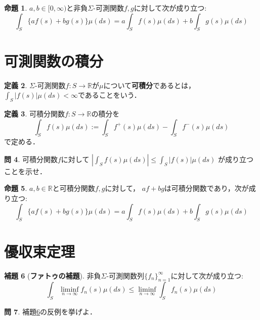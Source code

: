 \documentclass{jsreport}
\theoremstyle{definition}
\newtheorem{defi}{定義}[section]
\newtheorem{lem}[defi]{補題}
\newtheorem{prop}[defi]{命題}
\newtheorem{qst}[defi]{問}
\begin{document}
\begin{prop}\label{prop_linearity_of_nonnegative_function_integral}
$a,b\in[0,\infty)$と非負$\Sigma$-可測関数$f,g$に対して次が成り立つ:
\[ \int_S\{af(s)+bg(s)\}\mu(ds)=a\int_Sf(s)\mu(ds)+b\int_Sg(s)\mu(ds) \]
\end{prop}

\section{可測関数の積分}

\begin{defi}\label{def_integrable_function}
$\Sigma$-可測関数$f \colon S\to\mathbb{R}$が$\mu$について\textbf{可積分}であるとは，
$\displaystyle\int_S|f(s)|\mu(ds)<\infty$であることをいう．

\end{defi}

\begin{defi}\label{def_measurable_function_integral}
可積分関数$f \colon S\to\mathbb{R}$の積分を
\[ \int_S f(s)\mu(ds):=\int_S f^+(s)\mu(ds)-\int_S f^-(s)\mu(ds)  \]
で定める．
\end{defi}

\begin{qst}\label{qst_absolute_integral_and_integral_absolute}
可積分関数$f$に対して
$\displaystyle\left|\int_Sf(s)\mu(ds)\right|\leq\int_S|f(s)|\mu(ds)$
が成り立つことを示せ．
\end{qst}

\begin{prop}\label{prop_linearity_of_integrable_function_integral}
$a,b\in\mathbb{R}$と可積分関数$f,g$に対して，
$af+bg$は可積分関数であり，次が成り立つ:
\[ \int_S\{af(s)+bg(s)\}\mu(ds)=a\int_Sf(s)\mu(ds)+b\int_Sg(s)\mu(ds) \]
\end{prop}

\section{優収束定理}

\begin{lem}[\textbf{ファトゥの補題}]\label{Fatou_lemma}
非負$\Sigma$-可測関数列$\{f_n\}_{n=1}^\infty$に対して次が成り立つ:
\[ \int_S\liminf_{n\to\infty}f_n(s)\mu(ds)\leq\liminf_{n\to\infty}\int_S f_n(s)\mu(ds) \]
\end{lem}

\begin{qst}\label{qst_counterexample_of_Fatou_lemma}
補題\ref{Fatou_lemma}の反例を挙げよ．
\end{qst}
\end{document}
